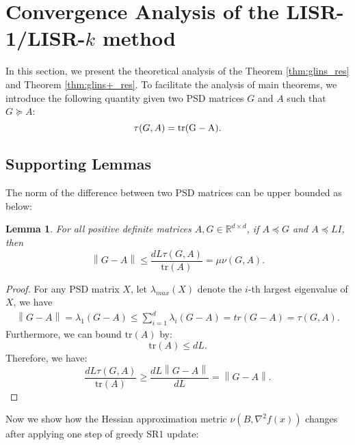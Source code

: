 \documentclass[letterpaper]{article} %
\theoremstyle{plain}
\newtheorem{lemma}[theorem]{Lemma}
\theoremstyle{definition}
\theoremstyle{remark}
\newcommand\norm[1]{\left\lVert#1\right\rVert}
\def\BR{{\mathbb{R}}}
\begin{document}
\section{Convergence Analysis of the LISR-1/LISR-$k$ method} \label{appendix:main_result_proof}
In this section, we present the theoretical analysis of the Theorem \ref{thm:glins_res} and Theorem \ref{thm:glins+_res}.
To facilitate the analysis of main theorems, we introduce the following quantity given two PSD matrices $G$ and $A$ such that $G \succeq A$:
\begin{equation*}
    \tau(G, A) = \rm tr(G - A).
\end{equation*}
\subsection{Supporting Lemmas}
The norm of the difference between two PSD matrices can be upper bounded as below:
\begin{lemma}
    For all positive definite matrices $A, G \in \BR^{d \times d}$, if $A \preceq G$ and $A \preceq L I$, then
    \begin{equation*}
        \norm{G - A} \leq \frac{d L \tau(G, A)}{\mathrm{tr}(A)} = \mu \nu(G, A).
    \end{equation*}
    \label{lemma:norm_bound}
\end{lemma}
\begin{proof}
    For any PSD matrix $X$, let $\lambda_{max}(X)$ denote the $i$-th largest eigenvalue of $X$, we have
    \begin{align*}
        \norm{G - A} = \lambda_1(G- A) \leq \sum_{i=1}^d \lambda_i(G - A) = tr(G - A) = \tau(G, A).
    \end{align*}
    Furthermore, we can bound $\mathrm{tr}(A)$ by:
    \begin{equation*}
        \mathrm{tr}(A) \leq d L.
    \end{equation*}
    Therefore, we have:
    \begin{equation*}
        \frac{d L \tau(G, A)}{\mathrm{tr}(A)} \geq \frac{d L \norm{G - A}}{d L} = \norm{G - A}.
    \end{equation*}
\end{proof}
Now we show how the Hessian approximation metric $\nu(B, \nabla^2 f(x))$ changes after applying one step of greedy SR1 update:
\end{document}
